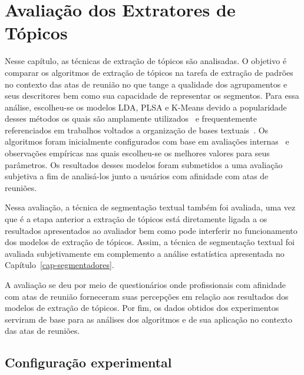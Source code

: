 \chapter{Avaliação dos Extratores de Tópicos}\label{cap-extratores}


Nesse capítulo, as técnicas de extração de tópicos são analisadas. O objetivo é comparar os algoritmos de extração de tópicos na tarefa de extração de padrões no contexto das atas de reunião no que tange a qualidade dos agrupamentos e seus descritores bem como sua capacidade de representar os segmentos. Para essa análise, escolheu-se os modelos LDA, PLSA e K-Means devido a popularidade desses métodos os quais são amplamente utilizados~\cite{DZhu20122} e frequentemente referenciados em trabalhos voltados a organização de bases textuais~\cite{Aggarwal2018, OCallaghan2015, Steyvers2007}.
Os algoritmos foram inicialmente configurados com base em avaliações internas~\cite{Hassani2017} e observações empíricas nas quais escolheu-se os melhores valores para seus parâmetros. Os resultados desses modelos foram submetidos a uma avaliação subjetiva a fim de analisá-los junto a usuários com afinidade com atas de reuniões. 

Nessa avaliação, a técnica de segmentação textual também foi avaliada, uma vez que é a etapa anterior a extração de tópicos está diretamente ligada a os resultados apresentados ao avaliador bem como pode interferir no funcionamento dos modelos de extração de tópicos. Assim, a técnica de segmentação textual foi avaliada subjetivamente em complemento a análise estatística apresentada no Capítulo~\ref{cap-segmentadores}.

A avaliação se deu por meio de questionários onde profissionais com afinidade com atas de reunião forneceram suas percepções em relação aos resultados dos modelos de extração de tópicos. Por fim, os dados obtidos dos experimentos serviram de base para as análises dos algoritmos e de sua aplicação no contexto das atas de reuniões.

\section{Configuração experimental}

